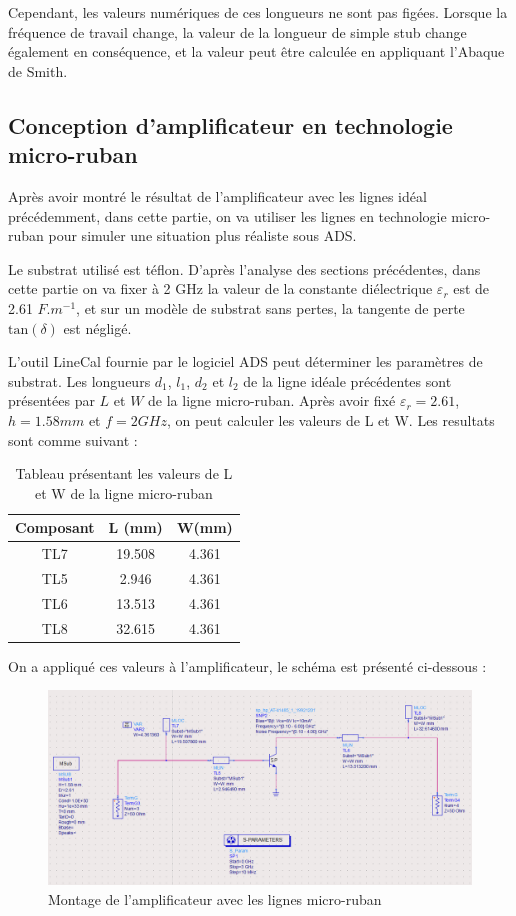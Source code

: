 \documentclass[french]{article}
\begin{document}
Cependant, les valeurs numériques de ces longueurs ne sont pas figées. Lorsque la fréquence de travail change, la valeur de la longueur de simple stub change également en conséquence, et la valeur peut être calculée en appliquant l’Abaque de Smith.

\subsection{Conception d’amplificateur en technologie micro-ruban}
Après avoir montré le résultat de l’amplificateur avec les lignes idéal précédemment, dans cette partie, on va utiliser les lignes en technologie micro-ruban pour simuler une situation plus réaliste sous ADS.

Le substrat utilisé est téflon. D'après l'analyse des sections précédentes, dans cette partie on va fixer à 2 GHz la valeur de la constante diélectrique $\varepsilon_{r}$ est de 2.61 $F.m^{-1}$, et sur un modèle de substrat sans pertes, la tangente de perte $\mbox{tan}(\delta)$ est négligé.

L’outil LineCal fournie par le logiciel ADS peut déterminer les paramètres de substrat. Les longueurs $d_{1}$, $l_{1}$, $d_{2}$ et $l_{2}$ de la ligne idéale précédentes sont présentées par $L$ et $W$ de la ligne micro-ruban. Après avoir fixé $\varepsilon_{r}=2.61$, $h=1.58 mm$ et $f=2 GHz$, on peut calculer les valeurs de L et W. Les resultats sont comme suivant :

\begin{table}[H]
	\centering
	\begin{tabular}{|c|c|c|}
		\hline
		Composant & L (mm) & W(mm) \\
		\hline
		TL7 & 19.508 & 4.361 \\
		\hline
		TL5 & 2.946 & 4.361 \\
		\hline
		TL6 & 13.513 & 4.361 \\
		\hline
		TL8 & 32.615 & 4.361\\
		\hline
	\end{tabular}
	\caption{Tableau présentant les valeurs de L et W de la ligne micro-ruban}
\end{table}

On a appliqué ces valeurs à l'amplificateur, le schéma est présenté ci-dessous :
\begin{figure}[H]
	\centering
	\includegraphics[width=1.0\linewidth]{../5SynthAmp/ligne_micro_ruban}
	\caption{Montage de l’amplificateur avec les lignes micro-ruban}
	\label{fig:ligne_micro_ruban}
\end{figure}
\end{document}

